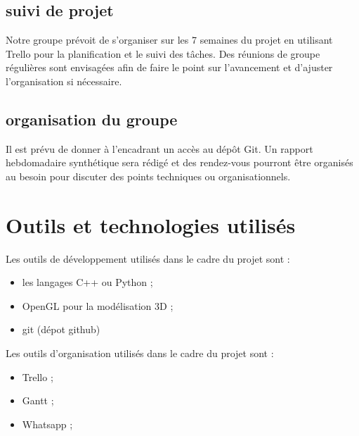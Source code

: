 \documentclass[11pt,a4paper,twocolumn]{article}
\begin{document}
\subsection{suivi de projet}

Notre groupe prévoit de s’organiser sur les 7 semaines du projet en utilisant Trello pour la planification et le suivi des tâches. Des réunions de groupe régulières sont envisagées afin de faire le point sur l’avancement et d’ajuster l’organisation si nécessaire.

\subsection{organisation du groupe}

Il est prévu de donner à l’encadrant un accès au dépôt Git. Un rapport hebdomadaire synthétique sera rédigé et des rendez-vous pourront être organisés au besoin pour discuter des points techniques ou organisationnels.

\section{Outils et technologies utilisés}

Les outils de développement utilisés dans le cadre du projet sont :
\begin{itemize}
    \item les langages C++ ou Python ;
    \item  OpenGL pour la modélisation 3D ;
    \item git (dépot github)
\end{itemize}

Les outils d'organisation utilisés dans le cadre du projet sont :
\begin{itemize}
    \item Trello ;
    \item Gantt ;
    \item Whatsapp ;
\end{itemize}
\end{document}
